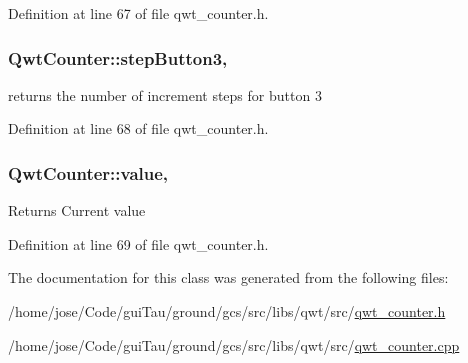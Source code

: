 Definition at line 67 of file qwt\-\_\-counter.\-h.

\hypertarget{class_qwt_counter_ae484def1d66d3fb1c720e4ee4a67c512}{
\subsubsection[{step\-Button3}]{ Qwt\-Counter\-::step\-Button3\hspace{0.3cm}{\ttfamily [read]}, {\ttfamily [write]}}}\label{class_qwt_counter_ae484def1d66d3fb1c720e4ee4a67c512}


returns the number of increment steps for button 3 



Definition at line 68 of file qwt\-\_\-counter.\-h.

\hypertarget{class_qwt_counter_a6f98bf5e2110835ce0c00425e682b7e2}{
\subsubsection[{value}]{ Qwt\-Counter\-::value\hspace{0.3cm}{\ttfamily [read]}, {\ttfamily [write]}}}\label{class_qwt_counter_a6f98bf5e2110835ce0c00425e682b7e2}
\begin{DoxyReturn}{Returns}
Current value 
\end{DoxyReturn}


Definition at line 69 of file qwt\-\_\-counter.\-h.



The documentation for this class was generated from the following files\-:\begin{DoxyCompactItemize}
\item 
/home/jose/\-Code/gui\-Tau/ground/gcs/src/libs/qwt/src/\hyperlink{qwt__counter_8h}{qwt\-\_\-counter.\-h}\item 
/home/jose/\-Code/gui\-Tau/ground/gcs/src/libs/qwt/src/\hyperlink{qwt__counter_8cpp}{qwt\-\_\-counter.\-cpp}\end{DoxyCompactItemize}
